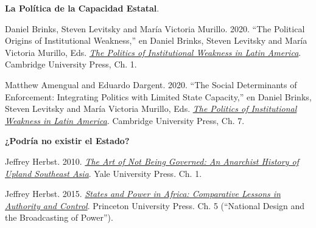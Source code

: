 \documentclass[letterpaper]{article}
\renewenvironment{itemize}{
  \begin{list}{}{
    \setlength{\leftmargin}{1.5em}
  }
}{
  \end{list}
}
\begin{document}
\begin{enumerate}[label=\roman*.]
\begin{itemize}


			\item[9.] {\bf La Pol\'itica de la Capacidad Estatal}.
				\begin{itemize}
					\item[$\circ$] Daniel Brinks, Steven Levitsky and Mar\'ia Victoria Murillo. 2020. ``The Political Origins of Institutional Weakness,'' en Daniel Brinks, Steven Levitsky and Mar\'ia Victoria Murillo, Eds. \href{https://github.com/hbahamonde/Ciencia_Politica_II/raw/master/Readings/Brinks_Levitsky_Murillo.pdf}{\emph{The Politics of Institutional Weakness in Latin America}}. Cambridge University Press, Ch. 1.
					\item[$\circ$] Matthew Amengual and Eduardo Dargent. 2020. ``The Social Determinants of Enforcement: Integrating Politics with Limited State Capacity,'' en Daniel Brinks, Steven Levitsky and Mar\'ia Victoria Murillo, Eds. \href{https://github.com/hbahamonde/Ciencia_Politica_II/raw/master/Readings/Brinks_Levitsky_Murillo.pdf}{\emph{The Politics of Institutional Weakness in Latin America}}. Cambridge University Press, Ch. 7.
				\end{itemize}



		\item[10.] {\bf ¿Podr\'ia no existir el Estado?}
				\begin{itemize}
          \item[$\circ$] Jeffrey Herbst. 2010. \href{https://github.com/hbahamonde/Ciencia_Politica_II/raw/master/Readings/Scott.pdf}{\emph{The Art of Not Being Governed: An Anarchist History of Upland Southeast Asia}}. Yale University Press. Ch. 1.
					\item[$\circ$] Jeffrey Herbst. 2015. \href{https://github.com/hbahamonde/Ciencia_Politica_II/raw/master/Readings/Herbst.pdf}{\emph{States and Power in Africa: Comparative Lessons in Authority and Control}}. Princeton University Press. Ch. 5 (``National Design and the Broadcasting of Power'').
        		\end{itemize}	




\end{itemize}
\end{enumerate}
\end{document}

